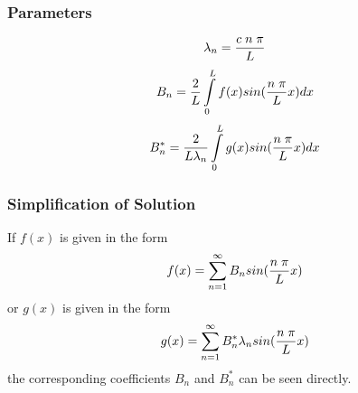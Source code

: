 \subsubsection{Parameters}
\begin{equation}
\lambda_n=\frac{c\; n\; \pi}{L} \label{eq:formel2}\vspace{-2pt} 
\end{equation}
\begin{equation} B_n=\frac{2}{L}\int\limits_0^L f(x)sin(\frac{n\;\pi}{L}x)dx \label{eq:formel3}\vspace{-2pt}
\end{equation}
\begin{equation} B_n^*=\frac{2}{L\lambda_n} \int\limits_0^L g(x) sin(\frac{n\;\pi}{L}x)dx \label{eq:formel4}\vspace{-2pt}
\end{equation}
%
%
\subsubsection{Simplification of Solution}
If $f(x)$ is given in the form
\begin{equation}f(x)=\sum\limits_{n=1}^{\infty} B_n sin(\frac{n\;\pi}{L}x) \label{eq:formel5}\vspace{-2pt}
\end{equation}
or $g(x)$ is given in the form
\begin{equation} g(x)=\sum\limits_{n=1}^{\infty} B_n^* \lambda_n sin(\frac{n\;\pi}{L}x) \label{eq:formel6}\vspace{-2pt}
\end{equation}
the corresponding coefficients $B_n$ and $B_n^*$ can be seen directly.
%
%
